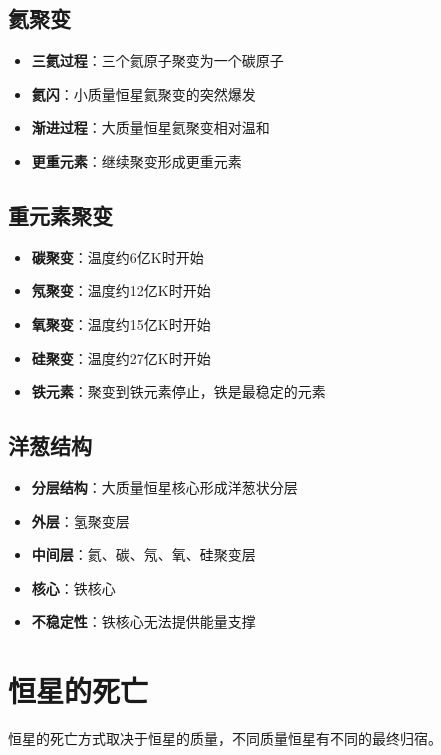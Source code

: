 \documentclass[12pt,UTF8]{ctexbook}
\begin{document}
\subsection{氦聚变}

\begin{itemize}
  \item \textbf{三氦过程}：三个氦原子聚变为一个碳原子
  \item \textbf{氦闪}：小质量恒星氦聚变的突然爆发
  \item \textbf{渐进过程}：大质量恒星氦聚变相对温和
  \item \textbf{更重元素}：继续聚变形成更重元素
\end{itemize}

\subsection{重元素聚变}

\begin{itemize}
  \item \textbf{碳聚变}：温度约6亿K时开始
  \item \textbf{氖聚变}：温度约12亿K时开始
  \item \textbf{氧聚变}：温度约15亿K时开始
  \item \textbf{硅聚变}：温度约27亿K时开始
  \item \textbf{铁元素}：聚变到铁元素停止，铁是最稳定的元素
\end{itemize}

\subsection{洋葱结构}

\begin{itemize}
  \item \textbf{分层结构}：大质量恒星核心形成洋葱状分层
  \item \textbf{外层}：氢聚变层
  \item \textbf{中间层}：氦、碳、氖、氧、硅聚变层
  \item \textbf{核心}：铁核心
  \item \textbf{不稳定性}：铁核心无法提供能量支撑
\end{itemize}

\section{恒星的死亡}

恒星的死亡方式取决于恒星的质量，不同质量恒星有不同的最终归宿。
\end{document}
